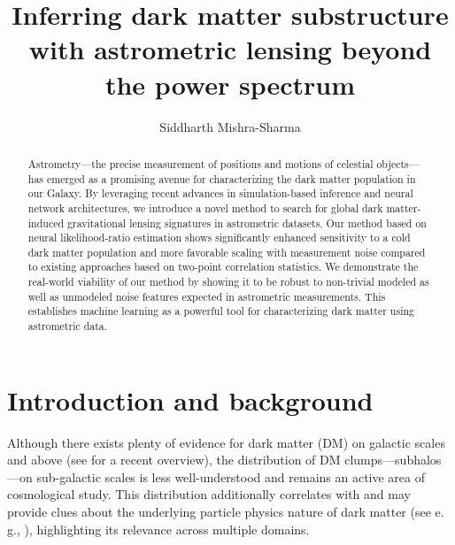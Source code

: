 \documentclass[twocolumn]{aastex631}
\newcommand{\eg}{{e.\,g.}\xspace}
\begin{document}
\sloppy\sloppypar\raggedbottom\frenchspacing

\title{Inferring dark matter substructure with astrometric lensing beyond the power spectrum}

\author[0000-0001-9088-7845]{Siddharth Mishra-Sharma}

\begin{abstract}\noindent
Astrometry---the precise measurement of positions and motions of celestial objects---has emerged as a promising avenue for characterizing the dark matter population in our Galaxy. By leveraging recent advances in simulation-based inference and neural network architectures, we introduce a novel method to search for global dark matter-induced gravitational lensing signatures in astrometric datasets. Our method based on neural likelihood-ratio estimation shows significantly enhanced sensitivity to a cold dark matter population and more favorable scaling with measurement noise compared to existing approaches based on two-point correlation statistics. We demonstrate the real-world viability of our method by showing it to be robust to non-trivial modeled as well as unmodeled noise features expected in astrometric measurements. This establishes machine learning as a powerful tool for characterizing dark matter using astrometric data. 
\end{abstract}


\section{Introduction and background}
\label{sec:intro}

Although there exists plenty of evidence for dark matter (DM) on galactic scales and above (see \citet{Green:2021jrr} for a recent overview), the distribution of DM clumps---subhalos---on sub-galactic scales is less well-understood and remains an active area of cosmological study. This distribution additionally correlates with and may provide clues about the underlying particle physics nature of dark matter (see \eg, \citet{Schutz:2020jox,Bode:2000gq,Dalcanton:2000hn}), highlighting its relevance across multiple domains.
\end{document}
